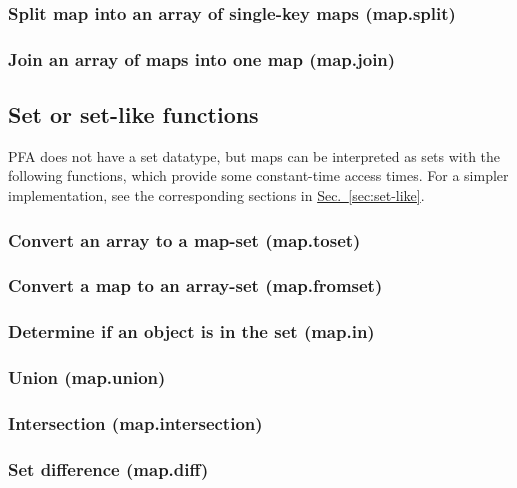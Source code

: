 \documentclass{article}
\theoremstyle{definition}
\begin{document}
\subsubsection{Split map into an array of single-key maps (map.split)}

\subsubsection{Join an array of maps into one map (map.join)}

\hypertarget{hsec:set-like-map}{}
\subsection{Set or set-like functions}
\label{sec:set-like-map}

PFA does not have a set datatype, but maps can be interpreted as sets with the following functions, which provide some constant-time access times.  For a simpler implementation, see the corresponding sections in \hyperlink{hsec:set-like}{Sec.~\ref{sec:set-like}}.

\subsubsection{Convert an array to a map-set (map.toset)}

\subsubsection{Convert a map to an array-set (map.fromset)}

\subsubsection{Determine if an object is in the set (map.in)}

\subsubsection{Union (map.union)}

\subsubsection{Intersection (map.intersection)}

\subsubsection{Set difference (map.diff)}
\end{document}
